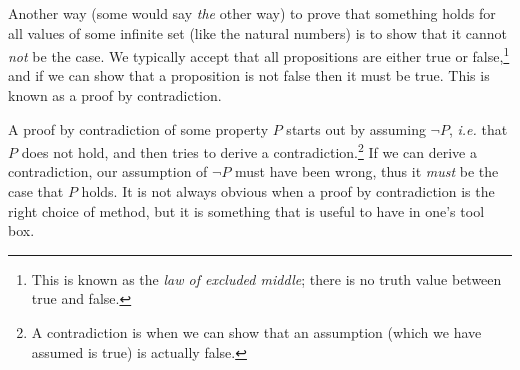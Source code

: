 \documentclass{tufte-handout}
\newcounter{example}
\newcounter{exc:first:proof}
\newenvironment{example}
{\refstepcounter{example}\begin{quote}
\textbf{Example \arabic{example}}}
{

$\square$\end{quote}}
\begin{document}
Another way (some would say \emph{the} other way) to prove that
something holds for all values of some infinite set (like the
natural numbers) is to show that it cannot \emph{not} be the case.
We typically accept that all propositions are either true or
false,\footnote{This is known as the \emph{law of excluded middle};
  there is no truth value between true and false. } and if we can
show that a proposition is not false then it must be true. This is
known as a proof by contradiction.

A proof by contradiction of some property $P$ starts out by
assuming $\lnot P$, \emph{i.e.} that $P$ does not hold, and then
tries to derive a contradiction.\footnote{A contradiction is when
  we can show that an assumption (which we have assumed is true)
  is actually false. }
%
If we can derive a contradiction, our assumption of $\lnot P$ must
have been wrong, thus it \emph{must} be the case that $P$ holds.
%
It is not always obvious when a proof by contradiction is the
right choice of method, but it is something that is useful to have
in one's tool box. %

\end{document}
